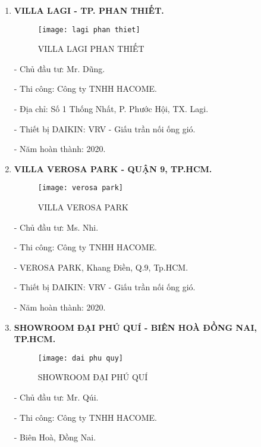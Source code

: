 \documentclass[12pt,a4paper]{article}
\begin{document}
\begin{enumerate}
\begin{enumerate}
\item \textbf{VILLA LAGI - TP. PHAN THIẾT.}
\begin{figure}[htbp]
  \centering
  \texttt{[image: lagi phan thiet]}
  \caption{VILLA LAGI PHAN THIẾT}
\end{figure}

\hspace{1cm} - Chủ đầu tư: Mr. Dũng.

\hspace{1cm} - Thi công: Công ty TNHH HACOME.

\hspace{1cm} - Địa chỉ: Số 1 Thống Nhất, P. Phước Hội, TX. Lagi.

\hspace{1cm} - Thiết bị DAIKIN: VRV - Giấu trần nối ống gió.

\hspace{1cm} - Năm hoàn thành: 2020.

\item \textbf{VILLA VEROSA PARK - QUẬN 9, TP.HCM.}
\begin{figure}[htbp]
  \centering
  \texttt{[image: verosa park]}
  \caption{VILLA VEROSA PARK}
\end{figure}
\newpage
\hspace{1cm} - Chủ đầu tư: Ms. Nhi.

\hspace{1cm} - Thi công: Công ty TNHH HACOME.

\hspace{1cm} - VEROSA PARK, Khang Điền, Q.9, Tp.HCM.

\hspace{1cm} - Thiết bị DAIKIN: VRV - Giấu trần nối ống gió.

\hspace{1cm} - Năm hoàn thành: 2020.

\item \textbf{SHOWROOM ĐẠI PHÚ QUÍ - BIÊN HOÀ ĐỒNG NAI, TP.HCM.}
\begin{figure}[htbp]
  \centering
  \texttt{[image: dai phu quy]}
  \caption{SHOWROOM ĐẠI PHÚ QUÍ}
\end{figure}

\hspace{1cm} - Chủ đầu tư: Mr. Qúi.

\hspace{1cm} - Thi công: Công ty TNHH HACOME.

\hspace{1cm} - Biên Hoà, Đồng Nai.


\end{enumerate}
\end{enumerate}
\end{document}

